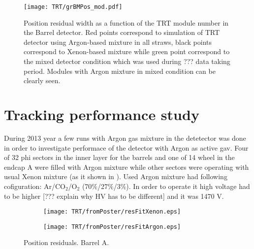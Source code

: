 \begin{figure}
\begin{center}
 \texttt{[image: TRT/grBMPos\_mod.pdf]}
\caption{ Position residual width as a function of the TRT module number in the Barrel detector. Red points correspond to simulation of TRT detector
using Argon-based mixture in all straws, black points correspond to Xenon-based mixture while green point correspond to the mixed detector condition
which was used during ??? data taking period. Modules with Argon mixture in mixed condition can be clearly seen.}
\label{fig:meanFreePath}
\end{center}
\end{figure}

\section{Tracking performance study}
\label{sec:TRT:trackPerf}

During 2013 year a few runs with Argon gas mixture in the detetector was done in order to investigate performace of the detector with Argon as active gav.
Four of 32 phi sectors in the inner layer for the barrels and one of 14 wheel in the endcap A were filled with Argon mixture while other sectors were operating 
with usual Xenon mixture (as it shown in ). Used Argon mixture had following cofiguration: Ar/CO$_{2}$/O$_{2}$ (70$\%$/27$\%$/3$\%$). In order to operate it high voltage had
to be higher [??? explain why HV has to be different] and it was 1470 V.




\begin{figure}

\begin{subfigure}{.5\textwidth}
  \centering
  \texttt{[image: TRT/fromPoster/resFitXenon.eps]}
\end{subfigure}%
\begin{subfigure}{.5\textwidth}
  \centering
  \texttt{[image: TRT/fromPoster/resFitArgon.eps]}
\end{subfigure}

\caption{Position residuals. Barrel A.}
  \label{fig:resFit}
\end{figure}





